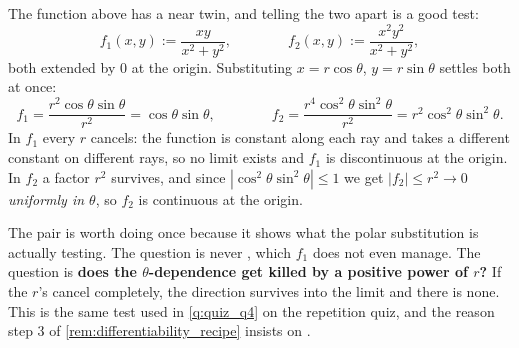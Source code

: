 \begin{remark}
\label{rem:continuity_contrast_pair}
The function above has a near twin, and telling the two apart is a good test:
\[f_1(x,y) := \frac{xy}{x^2+y^2}, \qquad\qquad f_2(x,y) := \frac{x^2y^2}{x^2+y^2},\]
both extended by $0$ at the origin. Substituting $x = r\cos\theta$, $y = r\sin\theta$ settles
both at once:
\[f_1 = \frac{r^2\cos\theta\sin\theta}{r^2} = \cos\theta\sin\theta,
\qquad\qquad
f_2 = \frac{r^4\cos^2\theta\sin^2\theta}{r^2} = r^2\cos^2\theta\sin^2\theta.\]
In $f_1$ every $r$ cancels: the function is constant along each ray and takes a different
constant on different rays, so no limit exists and $f_1$ is discontinuous at the origin. In
$f_2$ a factor $r^2$ survives, and since $|\cos^2\theta\sin^2\theta| \leq 1$ we get
$|f_2| \leq r^2 \to 0$ \emph{uniformly in $\theta$}, so $f_2$ is continuous at the origin.

The pair is worth doing once because it shows what the polar substitution is actually testing.
The question is never , which $f_1$ does
not even manage. The question is \textbf{does the $\theta$-dependence get killed by a positive
power of $r$?} If the $r$'s cancel completely, the direction survives into the limit and there is
none.
This is the same test used in \cref{q:quiz_q4} on the repetition quiz, and the reason
step 3 of \cref{rem:differentiability_recipe} insists on .
\end{remark}

\begin{center}
\end{center}

